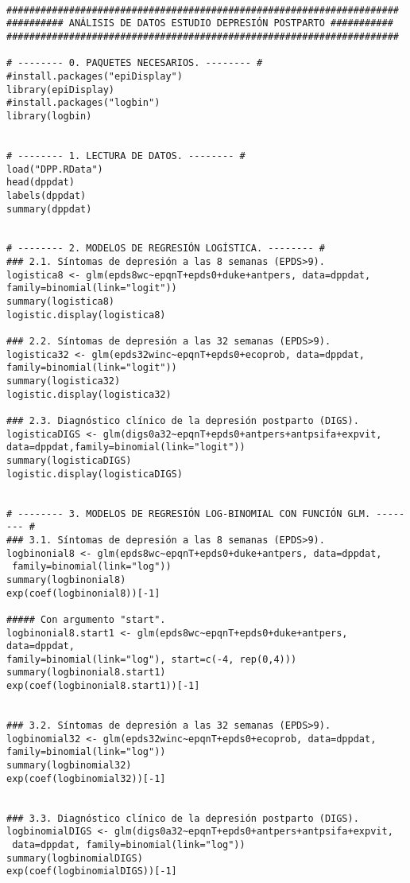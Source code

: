 \begin{Verbatim}

#####################################################################
########## ANÁLISIS DE DATOS ESTUDIO DEPRESIÓN POSTPARTO ###########
#####################################################################

# -------- 0. PAQUETES NECESARIOS. -------- #
#install.packages("epiDisplay")
library(epiDisplay)
#install.packages("logbin")
library(logbin)


# -------- 1. LECTURA DE DATOS. -------- #
load("DPP.RData")
head(dppdat)
labels(dppdat)
summary(dppdat)


# -------- 2. MODELOS DE REGRESIÓN LOGÍSTICA. -------- #
### 2.1. Síntomas de depresión a las 8 semanas (EPDS>9).
logistica8 <- glm(epds8wc~epqnT+epds0+duke+antpers, data=dppdat,
family=binomial(link="logit"))
summary(logistica8)
logistic.display(logistica8)

### 2.2. Síntomas de depresión a las 32 semanas (EPDS>9).
logistica32 <- glm(epds32winc~epqnT+epds0+ecoprob, data=dppdat,
family=binomial(link="logit"))
summary(logistica32)
logistic.display(logistica32)

### 2.3. Diagnóstico clínico de la depresión postparto (DIGS).
logisticaDIGS <- glm(digs0a32~epqnT+epds0+antpers+antpsifa+expvit, 
data=dppdat,family=binomial(link="logit"))
summary(logisticaDIGS)
logistic.display(logisticaDIGS)


# -------- 3. MODELOS DE REGRESIÓN LOG-BINOMIAL CON FUNCIÓN GLM. -------- #
### 3.1. Síntomas de depresión a las 8 semanas (EPDS>9).
logbinonial8 <- glm(epds8wc~epqnT+epds0+duke+antpers, data=dppdat,
 family=binomial(link="log"))
summary(logbinonial8)
exp(coef(logbinonial8))[-1]

##### Con argumento "start".
logbinonial8.start1 <- glm(epds8wc~epqnT+epds0+duke+antpers, data=dppdat, 
family=binomial(link="log"), start=c(-4, rep(0,4)))
summary(logbinonial8.start1)
exp(coef(logbinonial8.start1))[-1]


### 3.2. Síntomas de depresión a las 32 semanas (EPDS>9).
logbinomial32 <- glm(epds32winc~epqnT+epds0+ecoprob, data=dppdat, 
family=binomial(link="log"))
summary(logbinomial32)
exp(coef(logbinomial32))[-1]


### 3.3. Diagnóstico clínico de la depresión postparto (DIGS).
logbinomialDIGS <- glm(digs0a32~epqnT+epds0+antpers+antpsifa+expvit,
 data=dppdat, family=binomial(link="log"))
summary(logbinomialDIGS)
exp(coef(logbinomialDIGS))[-1]


\end{Verbatim}
